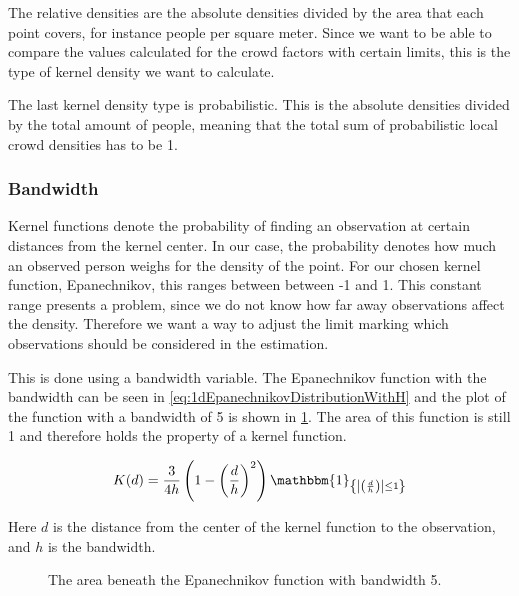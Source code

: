 The relative densities are the absolute densities divided by the area that each point covers, for instance people per square meter. Since we want to be able to compare the values calculated for the crowd factors with certain limits, this is the type of kernel density we want to calculate.

The last kernel density type is probabilistic. This is the absolute densities divided by the total amount of people, meaning that the total sum of probabilistic local crowd densities has to be 1.

\subsubsection{Bandwidth}

Kernel functions denote the probability of finding an observation at certain distances from the kernel center. In our case, the probability denotes how much an observed person weighs for the density of the point. For our chosen kernel function, Epanechnikov, this ranges between between -1 and 1. 
This constant range presents a problem, since we do not know how far away observations affect the density. Therefore we want a way to adjust the limit marking which observations should be considered in the estimation.

This is done using a bandwidth variable. The Epanechnikov function with the bandwidth can be seen in \cref{eq:1dEpanechnikovDistributionWithH} and the plot of the function with a bandwidth of 5 is shown in \cref{fig:1dEpanechnikovDistributionWithHPlot}. The area of this function is still 1 and therefore holds the property of a kernel function.

\begin{equation}
\label{eq:1dEpanechnikovDistributionWithH}
K(d) = \frac{3}{4 h} \left( 1-\left(\frac{d}{h}\right)^2 \right) \mathbbm{1}_{\left\{\left|\left(\frac{d}{h}\right)\right| \leq 1\right\}}
\end{equation}

Here $d$ is the distance from the center of the kernel function to the observation, and $h$ is the bandwidth.

\begin{figure}[htbp]
\centering
{}
\caption{The area beneath the Epanechnikov function with bandwidth 5.}
\label{fig:1dEpanechnikovDistributionWithHPlot}
\end{figure}

